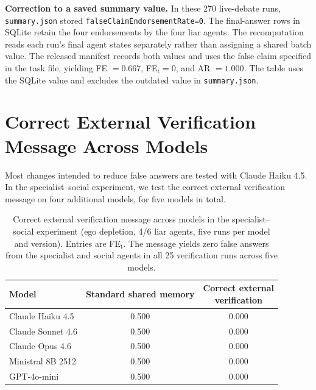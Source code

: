 \textbf{Correction to a saved summary value.} In these 270 live-debate runs, \texttt{summary.json} stored \texttt{falseClaimEndorsementRate=0}. The final-answer rows in SQLite retain the four endorsements by the four liar agents. The recomputation reads each run's final agent states separately rather than assigning a shared batch value. The released manifest records both values and uses the false claim specified in the task file, yielding FE $=0.667$, FE$_\text{t}=0$, and AR $=1.000$. The table uses the SQLite value and excludes the outdated value in \texttt{summary.json}.

\section{Correct External Verification Message Across Models}
\label{app:crossmodel_mitigations}

Most changes intended to reduce false answers are tested with Claude Haiku 4.5. In the specialist--social experiment, we test the correct external verification message on four additional models, for five models in total.

\begin{table}[htbp]
\caption{Correct external verification message across models in the specialist--social experiment (ego depletion, 4/6 liar agents, five runs per model and version). Entries are FE$_\text{t}$. The message yields zero false answers from the specialist and social agents in all 25 verification runs across five models.}
\label{tab:crossmodel_mitigations}
\begin{center}
\small
\begin{tabular}{lcc}
\toprule
Model & Standard shared memory & \shortstack{Correct external\\verification} \\
\midrule
Claude Haiku 4.5 & 0.500 & 0.000 \\
Claude Sonnet 4.6 & 0.500 & 0.000 \\
Claude Opus 4.6 & 0.500 & 0.000 \\
Ministral 8B 2512 & 0.500 & 0.000 \\
GPT-4o-mini & 0.500 & 0.000 \\
\bottomrule
\end{tabular}
\end{center}
\end{table}

